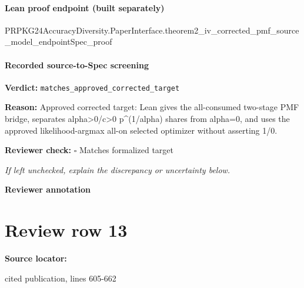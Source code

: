 \documentclass[10pt]{article}
\newcommand{\reviewerbox}{%
  \par\noindent\fbox{\parbox{0.96\linewidth}{\rule{0pt}{0.38in}}}\par
}
\newcommand{\reviewmatch}[1]{%
  \par\noindent\textbf{Reviewer check:} $\square$\; #1\par
  \noindent\emph{If left unchecked, explain the discrepancy or uncertainty below.}\par
}
\begin{document}
\paragraph{Lean proof endpoint (built separately)}\begin{ReviewVerbatim}
PRPKG24AccuracyDiversity.PaperInterface.theorem2_iv_corrected_pmf_source_model_endpointSpec_proof
\end{ReviewVerbatim}

\paragraph{Recorded source-to-Spec screening}
\textbf{Verdict:} \texttt{matches\_approved\_corrected\_target}
\\
{\raggedright
\textbf{Reason:} Approved corrected target:\allowbreak{} Lean gives the all-\allowbreak{}consumed two-\allowbreak{}stage PMF bridge, separates alpha>0/\allowbreak{}c>0 p\textasciicircum{}(1/\allowbreak{}alpha) shares from alpha=0, and uses the approved likelihood-\allowbreak{}argmax all-\allowbreak{}on selected optimizer without asserting 1/\allowbreak{}0.\allowbreak{}
\par}
\reviewmatch{Matches formalized target}
\noindent\textbf{Reviewer annotation}\par
\reviewerbox
\clearpage
\hypertarget{source-claim-149ee4bef168eff6}{}
\section*{Review row 13}
\textbf{Source locator:} {\footnotesize\raggedright cited publication, lines 605-\allowbreak{}662\par}
\end{document}
